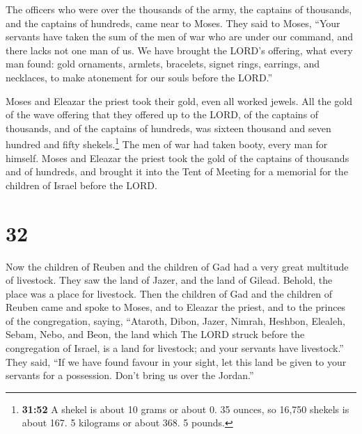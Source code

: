  The officers who were over the thousands of the army,
the captains of thousands, and the captains of hundreds, came near to
Moses.  They said to Moses, ``Your servants have taken
the sum of the men of war who are under our command, and there lacks not
one man of us.  We have brought the LORD's offering, what
every man found: gold ornaments, armlets, bracelets, signet rings,
earrings, and necklaces, to make atonement for our souls before the
LORD.''

 Moses and Eleazar the priest took their gold, even all
worked jewels.  All the gold of the wave offering that
they offered up to the LORD, of the captains of thousands, and of the
captains of hundreds, was sixteen thousand and seven hundred and fifty
shekels.\footnote{\textbf{31:52} A shekel is about 10 grams or about 0.
  35 ounces, so 16,750 shekels is about 167. 5 kilograms or about 368. 5
  pounds.}  The men of war had taken booty, every man for
himself.  Moses and Eleazar the priest took the gold of
the captains of thousands and of hundreds, and brought it into the Tent
of Meeting for a memorial for the children of Israel before the LORD.

\hypertarget{section-31}{%
\section{32}\label{section-31}}

 Now the children of Reuben and the children of Gad had a
very great multitude of livestock. They saw the land of Jazer, and the
land of Gilead. Behold, the place was a place for livestock.
 Then the children of Gad and the children of Reuben came
and spoke to Moses, and to Eleazar the priest, and to the princes of the
congregation, saying,  ``Ataroth, Dibon, Jazer, Nimrah,
Heshbon, Elealeh, Sebam, Nebo, and Beon,  the land which
The LORD struck before the congregation of Israel, is a land for
livestock; and your servants have livestock.''  They said,
``If we have found favour in your sight, let this land be given to your
servants for a possession. Don't bring us over the Jordan.''


